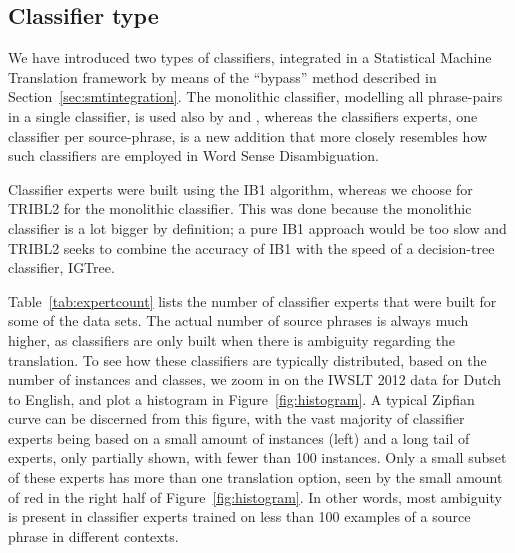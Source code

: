 \subsection{Classifier type}
\label{sec:typeopt}

We have introduced two types of classifiers, integrated in a Statistical
Machine Translation framework by means of the ``bypass'' method described in
Section~\ref{sec:smtintegration}. The monolithic classifier, modelling all phrase-pairs
in a single classifier, is used also by \cite{Stroppa+07} and
\cite{Rejwanul+11}, whereas the classifiers experts, one classifier per
source-phrase, is a new addition that more closely resembles how such
classifiers are employed in Word Sense Disambiguation.

Classifier experts were built using the IB1 algorithm, whereas we choose for
TRIBL2 for the monolithic classifier. This was done because the monolithic
classifier is a lot bigger by definition; a pure IB1 approach would be too slow
and TRIBL2 seeks to combine the accuracy of IB1 with the speed of a
decision-tree classifier, IGTree.

Table~\ref{tab:expertcount} lists the number of classifier experts that were
built for some of the data sets. The actual number of source phrases is always
much higher, as classifiers are only built when there is ambiguity regarding
the translation. To see how these classifiers are typically distributed, based
on the number of instances and classes, we zoom in on the IWSLT 2012 data for
Dutch to English, and plot a histogram in
Figure~\ref{fig:histogram}. A typical Zipfian curve can be discerned from
this figure, with the vast majority of classifier experts being based
on a small amount of instances (left) and a long tail of experts, only
partially shown, with fewer than 100 instances. Only a small subset of
these experts has more than one translation option, seen by the small
amount of red in the right half of Figure~\ref{fig:histogram}. In
other words, most ambiguity is present in classifier experts trained on less than
100 examples of a source phrase in different contexts.

